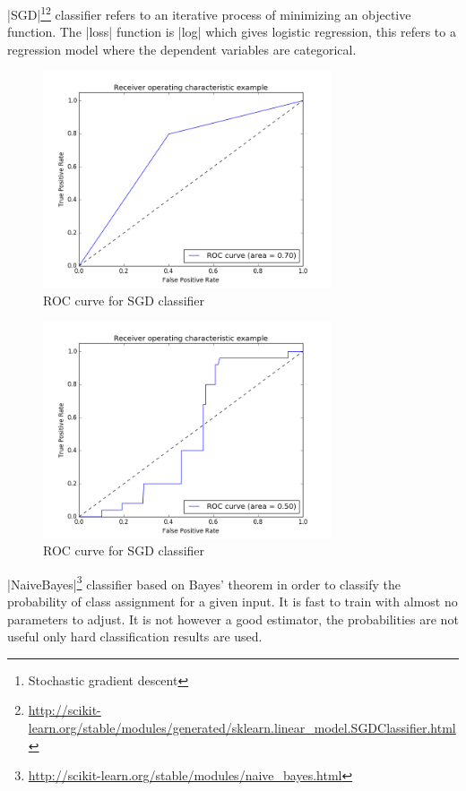 |SGD|\footnote{Stochastic gradient descent}\footnote{\url{http://scikit-learn.org/stable/modules/generated/sklearn.linear_model.SGDClassifier.html}} classifier refers to an iterative process of minimizing an objective function. The |loss| function is |log| which gives logistic regression, this refers to a regression model where the dependent variables are categorical.

\begin{figure}[ht!]
\centering
\includegraphics[width=23em]{images/out_sgdc_2.png}
\caption{ROC curve for SGD classifier}
\end{figure}

\begin{figure}[ht!]
\centering
\includegraphics[width=23em]{images/out_sgd.png}
\caption{ROC curve for SGD classifier}
\end{figure}

\FloatBarrier

|NaiveBayes|\footnote{\url{http://scikit-learn.org/stable/modules/naive_bayes.html}} classifier based on Bayes' theorem in order to classify the probability of class assignment for a given input. It is fast to train with almost no parameters to adjust. It is not however a good estimator, the probabilities are not useful only hard classification results are used.

